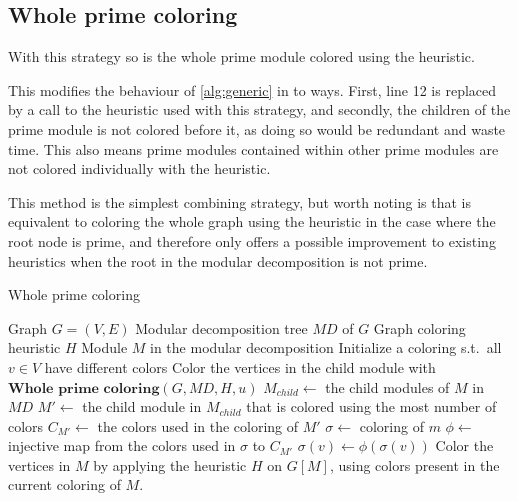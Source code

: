 \documentclass[a4paper]{article}
\begin{document}
\subsection{Whole prime coloring}

With this strategy so is the whole prime module colored using the heuristic. 

This modifies the behaviour of \autoref{alg:generic} in to ways. First, line 12 is replaced by a
call to the heuristic used with this strategy, and secondly, the children of the prime
module is not colored before it, as doing so would be redundant and waste time.
This also means prime modules contained within other prime modules are not
colored individually with the heuristic.

This method is the simplest combining strategy, but worth noting is that is
equivalent to coloring the whole graph using the heuristic in the case where the
root node is prime, and therefore only offers a possible improvement to existing
heuristics when the root in the modular decomposition is not prime.

\begin{algorithm}[H]
  \caption{Whole prime coloring}
  \label{alg:wpc}
  \begin{algorithmic}[1]
    \REQUIRE Graph $G = (V,E)$ 
    \REQUIRE Modular decomposition tree $MD$ of $G$
    \REQUIRE Graph coloring heuristic $H$
    \REQUIRE Module $M$ in the modular decomposition
    \STATE Initialize a coloring s.t.\ all $v \in V$
           have different colors
            \STATE Color the vertices in the child module with \\
            $\textbf{Whole prime coloring}(G,MD,H,u)$
        \ENDFOR
          \STATE $M_{child} \leftarrow $ the child modules of $M$ in $MD$
          \STATE $M' \leftarrow $ the child module in $M_{child}$ that is colored using the most number of colors
          \STATE $C_{M'} \leftarrow $ the colors used in the coloring of $M'$
             \STATE $\sigma \leftarrow $ coloring of $m$
             \STATE $\phi \leftarrow $ injective map from the colors used in $\sigma$ to $C_{M'}$
                \STATE $\sigma(v)\leftarrow \phi(\sigma(v))$  
             \ENDFOR
          \ENDFOR
        \ENDIF
    \ELSE
        \STATE Color the vertices in $M$ by applying the heuristic $H$ on $G[M]$, using colors present in the current coloring of $M$.
    \ENDIF
  \end{algorithmic}
\end{algorithm}
\end{document}
